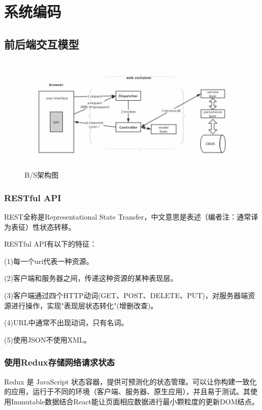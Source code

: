 \section{系统编码}

\subsection{前后端交互模型}

\begin{figure}[thbp!]
	\centering
	\includegraphics[width=1.0\linewidth]{figure/BS_structure}
	\caption{B/S架构图}
	\label{fig:BS_structure}
\end{figure}

\subsubsection{RESTful API}

REST全称是Representational State Transfer，中文意思是表述（编者注：通常译为表征）性状态转移。

RESTful API有以下的特征：

(1)每一个uri代表一种资源。

(2)客户端和服务器之间，传递这种资源的某种表现层。

(3)客户端通过四个HTTP动词(GET、POST、DELETE、PUT)，对服务器端资源进行操作，实现"表现层状态转化"(增删改查)。

(4)URL中通常不出现动词，只有名词。

(5)使用JSON不使用XML。

\subsubsection{使用Redux存储网络请求状态}

Redux 是 JavaScript 状态容器，提供可预测化的状态管理。可以让你构建一致化的应用，运行于不同的环境（客户端、服务器、原生应用），并且易于测试。其使用Immutable数据结合React能让页面相应数据进行最小颗粒度的更新DOM结点。

